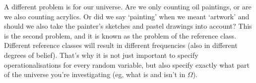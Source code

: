 A different problem is for our universe. Are we only counting oil paintings, or are we also counting acrylics. Or did we say `painting' when we meant `artwork' and should we also take the painter's sketches and pastel drawings into account? This is the second problem, and it is known as the problem of the reference class. Different reference classes will result in different frequencies (also in different degrees of belief). That's why it is not just important to specify operationalisations for every random variable, but also specify exactly what part of the universe you're investigating (eg, what is and isn't in $\Omega$).


